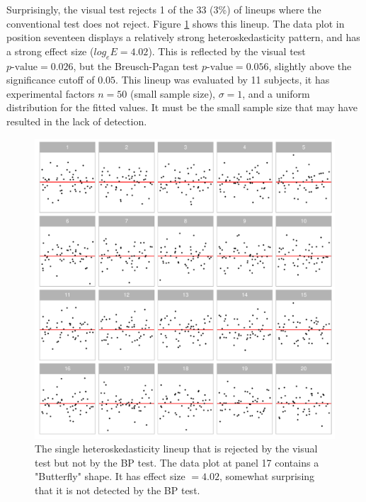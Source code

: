\documentclass[]{interact}
\theoremstyle{plain}%
\theoremstyle{definition}
\theoremstyle{remark}
\begin{document}
Surprisingly, the visual test rejects 1 of the 33 (3\%) of lineups where
the conventional test does not reject. Figure \ref{fig:heter-example}
shows this lineup. The data plot in position seventeen displays a
relatively strong heteroskedasticity pattern, and has a strong effect
size (\(log_e E=4.02\)). This is reflected by the visual test
\(p\text{-value} = 0.026\), but the Breusch-Pagan test
\(p\text{-value} = 0.056\), slightly above the significance cutoff of
\(0.05\). This lineup was evaluated by 11 subjects, it has experimental
factors \(n=50\) (small sample size), \(\sigma=1\), and a uniform
distribution for the fitted values. It must be the small sample size
that may have resulted in the lack of detection.

\begin{figure}

{\centering \includegraphics[width=1\linewidth]{paper_comparison_files/figure-latex/heter-example-1} 

}

\caption{The single heteroskedasticity lineup that is rejected by the visual test but not by the BP test. The data plot at panel 17 contains a "Butterfly" shape. It has effect size $ = 4.02$, somewhat surprising that it is not detected by the BP test.}\label{fig:heter-example}
\end{figure}
\end{document}
